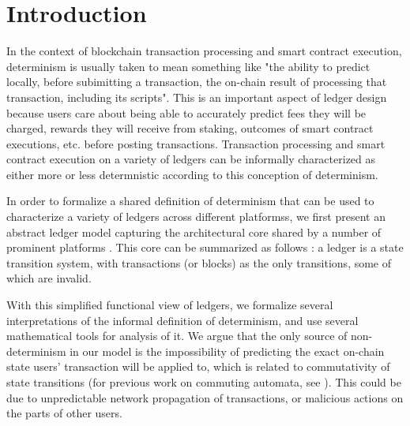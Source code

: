 \section{Introduction}
\label{sec:intro}

In the context of blockchain transaction processing and smart contract execution,
determinism is usually taken to mean something like "the ability to predict locally,
before subimitting a transaction, the on-chain result of processing that transaction, including its scripts".
This is an important aspect of ledger design because users care about being able to accurately predict
fees they will be charged, rewards they will receive from staking, outcomes of
smart contract executions, etc. before posting transactions.
Transaction processing and smart contract execution on a variety of ledgers can
be informally characterized as either more or less determnistic according to this conception
of determinism.

In order to formalize a shared definition of determinism that can be used to characterize a variety
of ledgers across different platformss, we first present an abstract
ledger model capturing the architectural core shared by a number of prominent
platforms \cite{Cardano-ledger-spec} \cite{tezos} \cite{ethereum} \cite{Nakamoto}.
This core can be summarized as follows : a ledger is a state transition system,
with transactions (or blocks) as the only transitions, some of which are
invalid.

With this simplified functional view of ledgers, we formalize several interpretations
of the informal definition of determinism, and use several mathematical tools
for analysis of it. We argue that
the only source of non-determinism in our model is the impossibility of
predicting the exact on-chain state users' transaction will be applied to,
which is related to commutativity of state transitions (for previous work on
commuting automata, see \cite{commautomata}). This
could be due to unpredictable network propagation of transactions, or malicious
actions on the parts of other users.


